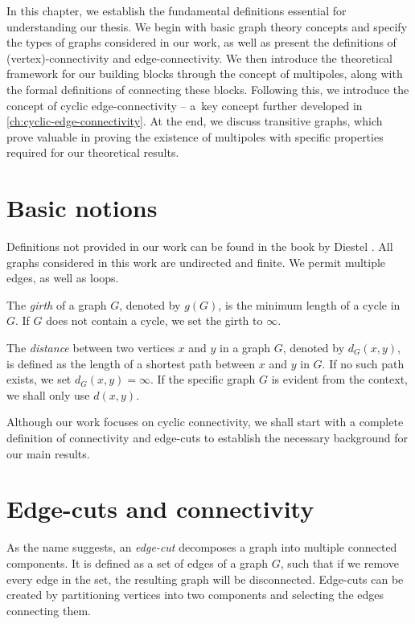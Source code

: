 \documentclass[12pt, twoside]{book}
\begin{document}
In this chapter, we establish the fundamental definitions essential for understanding our thesis. We begin with basic graph theory concepts and specify the types of graphs considered in our work, as well as present the definitions of (vertex)-connectivity and edge-connectivity. We then introduce the theoretical framework for our building blocks through the concept of multipoles, along with the formal definitions of connecting these blocks. Following this, we introduce the concept of cyclic edge-connectivity -- a~key concept further developed in \cref{ch:cyclic-edge-connectivity}. At the end, we discuss transitive graphs, which prove valuable in proving the existence of multipoles with specific properties required for our theoretical results.

\section{Basic notions}

Definitions not provided in our work can be found in the book  by Diestel \cite{Diestel}. All graphs considered in this work are undirected and finite. We permit multiple edges, as well as loops.

The \textit{girth} of a graph $G$, denoted by $g(G)$, is the minimum length of a cycle in $G$. If $G$ does not contain a cycle, we set the girth to $\infty$.

The \textit{distance} between two vertices $x$ and $y$ in a graph $G$, denoted by $d_G(x,y)$, is defined as the length of a shortest path between $x$ and $y$ in $G$. If no such path exists, we set $d_G(x,y)=\infty$. If the specific graph $G$ is evident from the context, we shall only use $d(x,y)$.

Although our work focuses on cyclic connectivity, we shall start with a complete definition of connectivity and edge-cuts to establish the necessary background for our main results.

\section{Edge-cuts and connectivity}\label{sec:edge-cuts}

As the name suggests, an \textit{edge-cut} decomposes a graph into multiple connected components. It is defined as a set of edges of a graph $G$, such that if we remove every edge in the set, the resulting graph will be disconnected. Edge-cuts can be created by partitioning vertices into two components and selecting the edges connecting them.
\end{document}
